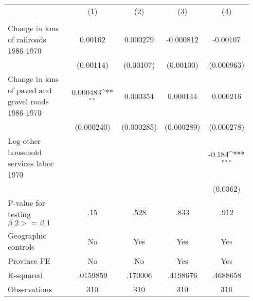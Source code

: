 {
\def\sym#1{\ifmmode^{#1}\else\(^{#1}\)\fi}
\begin{tabular}{l*{4}{c}}
\hline\hline
                &\multicolumn{1}{c}{(1)}&\multicolumn{1}{c}{(2)}&\multicolumn{1}{c}{(3)}&\multicolumn{1}{c}{(4)}\\
                &\multicolumn{1}{c}{}&\multicolumn{1}{c}{}&\multicolumn{1}{c}{}&\multicolumn{1}{c}{}\\
\hline
Change in kms of railroads 1986-1970&  0.00162         & 0.000279         &-0.000812         & -0.00107         \\
                &(0.00114)         &(0.00107)         &(0.00100)         &(0.000963)         \\
[1em]
Change in kms of paved and gravel roads 1986-1970& 0.000483\sym{**} & 0.000354         & 0.000144         & 0.000216         \\
                &(0.000240)         &(0.000285)         &(0.000289)         &(0.000278)         \\
[1em]
Log other household services labor 1970&                  &                  &                  &   -0.184\sym{***}\\
                &                  &                  &                  & (0.0362)         \\
\hline
P-value for testing $\beta\_{2} >= \beta\_{1}$&      .15         &     .528         &     .833         &     .912         \\
Geographic controls&       No         &      Yes         &      Yes         &      Yes         \\
Province FE     &       No         &       No         &      Yes         &      Yes         \\
R-squared       & .0159859         &  .170006         & .4198676         & .4688658         \\
Observations    &      310         &      310         &      310         &      310         \\
\hline\hline
\end{tabular}
}
